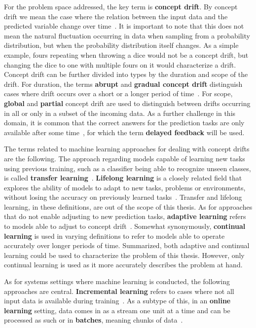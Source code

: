 For the problem space addressed, the key term is \textbf{concept drift}. By concept drift we mean the case where the relation between the input
data and the predicted variable change over time~\cite{conceptdriftsurvey}. It is important to note that this does not mean the natural fluctuation occurring in data when sampling from a probability distribution, but when the probability distribution itself changes. As a simple example, fours repeating when throwing a dice would not be a concept drift, but changing the dice to one with multiple fours on it would characterize a drift. Concept drift can be further divided into types by the duration and scope of the drift. For duration, the terms \textbf{abrupt} and \textbf{gradual concept drift} distinguish cases where drift occurs over a short or a longer period of time~\cite{zliobaiteAdaptiveTrainingSet2010}. For scope, \textbf{global} and \textbf{partial} concept drift are used to distinguish between drifts occurring in all or only in a subset of the incoming data. As a further challenge in this domain, it is common that the correct answers for the prediction tasks are only available after some time~\cite{adaptivelearningsystems}, for which the term  \textbf{delayed feedback} will be used. 

The terms related to machine learning approaches for dealing with concept drifts are the following. The approach regarding models capable of learning new tasks using previous training, such as a classifier being able to recognize unseen classes, is called \textbf{transfer learning}~\cite{iotsurvey}. \textbf{Lifelong learning} is a closely related field that explores the ability of models to adapt to new tasks, problems or environments, without losing the accuracy on previously learned tasks~\cite{lmlinneuralnets}. Transfer and lifelong learning, in these definitions, are out of the scope of this thesis. As for approaches that do not enable adjusting to new prediction tasks, \textbf{adaptive learning} refers to models able to adjust to concept drift~\cite{conceptdriftsurvey}. Somewhat synonymously, \textbf{continual learning} is used in varying definitions to refer to models able to operate accurately over longer periods of time. Summarized, both adaptive and continual learning could be used to characterize the problem of this thesis. However, only continual learning is used as it more accurately describes the problem at hand.

As for systems settings where machine learning is conducted, the following approaches are central. \textbf{Incremental learning} refers to cases where not all input data is available during training~\cite{giraud-carrierNoteUtilityIncremental2000}. As a subtype of this, in an \textbf{online learning} setting, data comes in as a stream one unit at a time and can be processed as such or in \textbf{batches}, meaning chunks of data~\cite{conceptdriftsurvey}.

